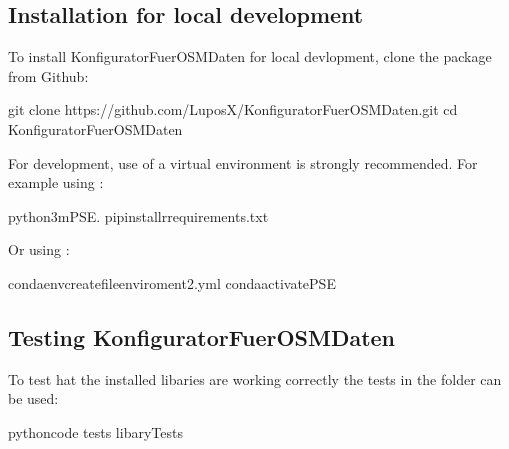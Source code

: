 \documentclass[letterpaper,10pt,english]{sphinxmanual}
\begin{document}
\subsection{Installation for local development}
\label{\detokenize{installation:installation-for-local-development}}
\sphinxAtStartPar
To install KonfiguratorFuerOSMDaten for local devlopment, clone the package from Github:

\begin{sphinxVerbatim}[commandchars=\\\{\}]
\PYGZdl{} git clone https://github.com/LuposX/KonfiguratorFuerOSMDaten.git
\PYGZdl{} cd KonfiguratorFuerOSMDaten
\end{sphinxVerbatim}

\sphinxAtStartPar
For development, use of a virtual environment is strongly recommended. For example
using :

\begin{sphinxVerbatim}[commandchars=\\\{\}]
python3\PYGZhy{}mPSE.
pipinstall\PYGZhy{}rrequirements.txt
 
\end{sphinxVerbatim}

\sphinxAtStartPar
Or using :

\begin{sphinxVerbatim}[commandchars=\\\{\}]
condaenvcreate\PYGZhy{}\PYGZhy{}fileenviroment2.yml
condaactivatePSE
 
\end{sphinxVerbatim}


\subsection{Testing KonfiguratorFuerOSMDaten}
\label{\detokenize{installation:testing-konfiguratorfuerosmdaten}}
\sphinxAtStartPar
To test hat the installed libaries are working correctly
the tests in the  folder can be used:

\begin{sphinxVerbatim}[commandchars=\\\{\}]
pythoncode
tests
libaryTests
\end{sphinxVerbatim}
\end{document}
